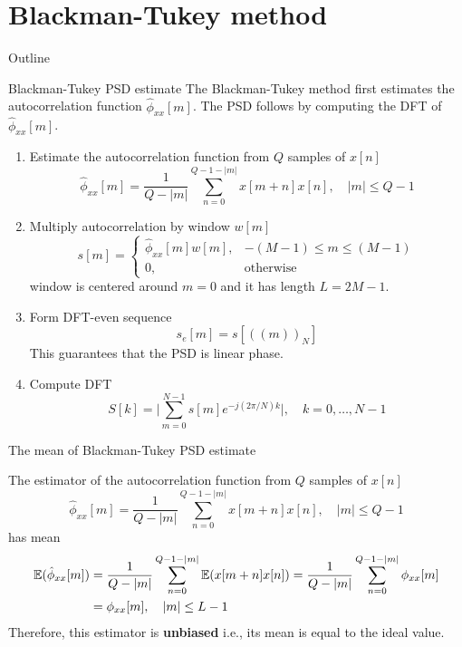 \documentclass[10pt]{beamer}
\begin{document}
\section{Blackman-Tukey method}
\begin{frame}{Outline}
\tableofcontents[currentsection]
\end{frame}

%
\begin{frame}{Blackman-Tukey PSD estimate}
	The Blackman-Tukey method first estimates the autocorrelation function $\hat{\phi}_{xx}[m]$. The PSD follows by computing the DFT of $\hat{\phi}_{xx}[m]$.
	\begin{enumerate}
		\item Estimate the autocorrelation function from $Q$ samples of $x[n]$
		\begin{equation*}
			\hat{\phi}_{xx}[m] = \frac{1}{Q-|m|}\sum_{n = 0}^{Q-1-|m|} x[m+n]x[n], \quad |m|\leq Q-1
		\end{equation*}
		\item Multiply autocorrelation by window $w[m]$
		\begin{equation*}
			s[m] = \begin{cases}
			\hat{\phi}_{xx}[m]w[m], & -(M-1)\leq m \leq (M-1) \\
			0, & \text{otherwise}
			\end{cases}
		\end{equation*}
		window is centered around $m = 0$ and it has length $L = 2M-1$.
		\item Form DFT-even sequence
		\begin{equation*}
			s_e[m] = s[((m))_N]
		\end{equation*}	
		This guarantees that the PSD is linear phase.
		\item Compute DFT
		\begin{equation*}
			S[k] = \bigg|\sum_{m = 0}^{N-1}s[m]e^{-j(2\pi/N)k}\bigg|, \quad k = 0, \ldots, N-1
		\end{equation*}
	\end{enumerate}
\end{frame}

%
\begin{frame}{The mean of Blackman-Tukey PSD estimate}

The estimator of the autocorrelation function from $Q$ samples of $x[n]$
\begin{equation*}
\hat{\phi}_{xx}[m] = \frac{1}{Q-|m|}\sum_{n = 0}^{Q-1-|m|} x[m+n]x[n], \quad |m|\leq Q-1
\end{equation*}
has mean
\begin{align*}
\operatorname{\mathbb{E}}(\hat{\phi}_{xx}[m]) &= \frac{1}{Q-|m|}\sum_{n=0}^{Q-1-|m|} \operatorname{\mathbb{E}}(x[m+n]x[n]) = \frac{1}{Q-|m|}\sum_{n=0}^{Q-1-|m|}\phi_{xx}[m] \\
&=\phi_{xx}[m], \quad |m|\leq L-1
\end{align*}
Therefore, this estimator is \textbf{unbiased} i.e., its mean is equal to the ideal value.
\end{frame}
\end{document}
